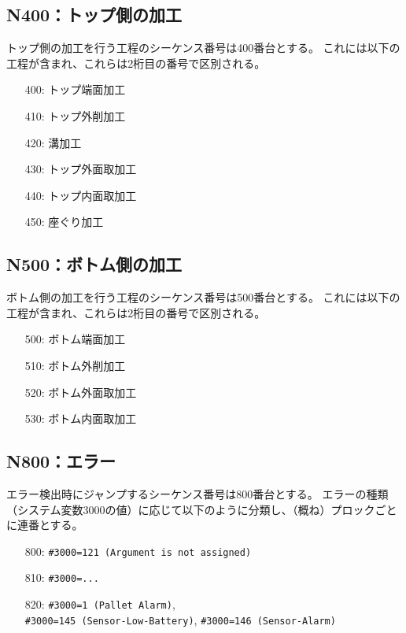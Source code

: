 \subsection{N400：トップ側の加工}
トップ側の加工を行う工程のシーケンス番号は400番台とする。
これには以下の工程が含まれ、これらは2桁目の番号で区別される。
\begin{enumerate}
\item[400:] トップ端面加工
\item[410:] トップ外削加工
\item[420:] 溝加工
\item[430:] トップ外面取加工
\item[440:] トップ内面取加工
\item[450:] 座ぐり加工
\end{enumerate}


\clearpage
\subsection{N500：ボトム側の加工}
ボトム側の加工を行う工程のシーケンス番号は500番台とする。
これには以下の工程が含まれ、これらは2桁目の番号で区別される。
\begin{enumerate}
\item[500:] ボトム端面加工
\item[510:] ボトム外削加工
\item[520:] ボトム外面取加工
\item[530:] ボトム内面取加工
\end{enumerate}


\subsection{N800：エラー\label{subsec:sequenceNerror}\TBW}
エラー検出時にジャンプするシーケンス番号は800番台とする。
エラーの種類（システム変数\ttNum3000の値）に応じて以下のように分類し、（概ね）プロックごとに連番とする。
\begin{enumerate}
\item[800:] \verb|#3000=121 (Argument is not assigned)|
\item[810:] \verb|#3000=...|
\item[820:] \verb|#3000=1 (Pallet Alarm)|,\\
            \verb|#3000=145 (Sensor-Low-Battery)|, \verb|#3000=146 (Sensor-Alarm)|
\end{enumerate}


